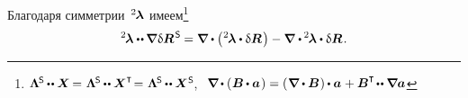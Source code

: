 \begin{otherlanguage}{russian}
\vspace{-0.16em} Благодаря симметрии~${^2\hspace{-0.2ex}\bm{\lambda}}$ имеем\footnote{${%
\bm{\Lambda}^{\hspace{-0.16ex}\mathsf{S}} \hspace{-0.1ex} \dotdotp \bm{X} \hspace{-0.2ex} =
\hspace{.1ex} \bm{\Lambda}^{\hspace{-0.16ex}\mathsf{S}} \hspace{-0.1ex} \dotdotp \bm{X}^{\T} \hspace{-0.4ex} =
\hspace{.1ex} \bm{\Lambda}^{\hspace{-0.16ex}\mathsf{S}} \hspace{-0.1ex} \dotdotp \bm{X}^{\hspace{.08ex}\mathsf{S}}
\hspace{-0.25ex}}$, ${\hspace{0.4em}
\boldnabla \hspace{-0.1ex} \dotp \left( \hspace{0.1ex} {\bm{B}} \hspace{-0.1ex} \dotp \bm{a} \hspace{0.16ex} \right) = \left( \hspace{0.1ex} \boldnabla \dotp \bm{B} \hspace{0.1ex} \right) \hspace{-0.1ex} \dotp \bm{a} \hspace{0.1ex} + \bm{B}^{\T} \hspace{-0.25ex} \dotdotp \boldnabla \bm{a}
}$}
\nopagebreak\vspace{.1em}\begin{equation*}
{^2\hspace{-0.2ex}\bm{\lambda}} \dotdotp \hspace{-0.1ex} \boldnabla \hspace{.1ex} \variation{\bm{R}}^{\hspace{.2ex}\mathsf{S}} \hspace{-0.1ex} =
\boldnabla^{\mathstrut} \hspace{-0.1ex} \dotp \left( \hspace{0.1ex} {^2\hspace{-0.2ex}\bm{\lambda}} \dotp \variation{\bm{R}} \hspace{0.2ex} \right)
- \boldnabla \hspace{0.1ex} \dotp \hspace{-0.1ex} {^2\hspace{-0.2ex}\bm{\lambda}} \dotp \variation{\bm{R}} \hspace{0.2ex}.
\end{equation*}


\end{otherlanguage}
